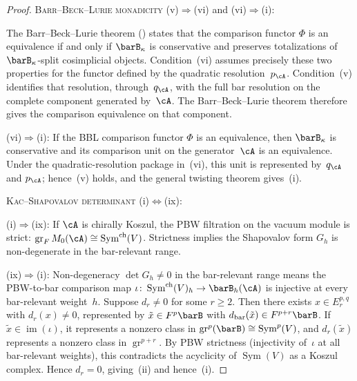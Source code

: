 \begin{proof}
\medskip
\textsc{Barr--Beck--Lurie monadicity}
\textup{(v)}$\Rightarrow$\textup{(vi)} and
\textup{(vi)}$\Rightarrow$\textup{(i)}:

\smallskip\noindent
The Barr--Beck--Lurie theorem (\cite[Theorem~4.7.3.5]{HA}) states
that the comparison functor $\Phi$ is an equivalence if and only if
$\barB_\kappa$ is conservative and preserves totalizations of
$\barB_\kappa$-split cosimplicial objects.
Condition~\textup{(vi)} assumes precisely these two properties for
the functor defined by the quadratic resolution~$p_\cA$.
Condition~\textup{(v)} identifies that resolution, through~$q_\cA$,
with the full bar resolution on the complete component generated
by~$\cA$.  The Barr--Beck--Lurie theorem therefore gives the
comparison equivalence on that component.

\smallskip\noindent
\textup{(vi)}$\Rightarrow$\textup{(i)}:
If the BBL comparison functor $\Phi$ is an equivalence, then
$\barB_\kappa$ is conservative and its comparison unit on the
generator~$\cA$ is an equivalence.  Under the quadratic-resolution
package in~\textup{(vi)}, this unit is represented by~$q_\cA$ and
$p_\cA$; hence~\textup{(v)} holds, and the general twisting theorem
gives~\textup{(i)}.

\medskip
\textsc{Kac--Shapovalov determinant}
\textup{(i)}$\Leftrightarrow$\textup{(ix)}:

\smallskip\noindent
\textup{(i)}$\Rightarrow$\textup{(ix)}:
If $\cA$ is chirally Koszul, the PBW filtration on the vacuum
module is strict: $\operatorname{gr}_F M_0(\cA) \cong
\operatorname{Sym}^{\mathrm{ch}}(V)$. Strictness implies the
Shapovalov form $G_h$ is non-degenerate in the bar-relevant range.

\smallskip\noindent
\textup{(ix)}$\Rightarrow$\textup{(i)}:
Non-degeneracy $\det G_h \neq 0$ in the bar-relevant range
means the PBW-to-bar comparison map
$\iota \colon \operatorname{Sym}^{\mathrm{ch}}(V)_h \to
\barB_h(\cA)$ is injective at every bar-relevant weight~$h$.
Suppose $d_r \neq 0$ for some $r \geq 2$. Then there exists
$x \in E_r^{p,q}$ with $d_r(x) \neq 0$, represented by
$\tilde{x} \in F^p\barB$ with $d_{\mathrm{bar}}(\tilde{x})
\in F^{p+r}\barB$. If $\tilde{x} \in \operatorname{im}(\iota)$,
it represents a nonzero class in
$\operatorname{gr}^p(\barB) \cong \operatorname{Sym}^p(V)$,
and $d_r(\tilde{x})$ represents a nonzero class in
$\operatorname{gr}^{p+r}$. By PBW strictness (injectivity
of~$\iota$ at all bar-relevant weights), this contradicts the
acyclicity of $\operatorname{Sym}(V)$ as a Koszul complex.
Hence $d_r = 0$, giving~(ii) and hence~(i).


\end{proof}
